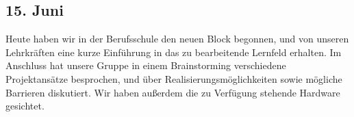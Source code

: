 \subsection{15. Juni}
Heute haben wir in der Berufsschule den neuen Block begonnen, und von unseren Lehrkräften eine kurze Einführung in das zu bearbeitende Lernfeld erhalten. Im Anschluss hat unsere Gruppe in einem Brainstorming verschiedene Projektansätze besprochen, und über Realisierungsmöglichkeiten sowie mögliche Barrieren diskutiert. Wir haben außerdem die zu Verfügung stehende Hardware gesichtet.